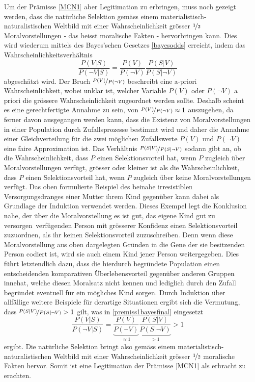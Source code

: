 \documentclass[a4paper,11pt]{article}
\numberwithin{equation}{section}
\begin{document}
Um der Prämisse \ref{MCN1} aber Legitimation zu erbringen, muss noch gezeigt werden, dass die natürliche Selektion gemäss einem materialistisch-naturalistischen Weltbild mit einer Wahrscheinlichkeit grösser $\nicefrac{1}{2}$ Moralvorstellungen -  das heisst moralische Fakten - hervorbringen kann. Dies wird wiederum mittels des Bayes'schen Gesetzes \eqref{bayesodds} erreicht, indem das Wahrscheinlichkeitsverhältnis \begin{equation}\label{premiss1bayesfinal}
\frac{P(V|S)}{P(\neg V|S)}
= \frac{P(V)}{P(\neg V)}\frac{P(S|V)}{P(S|\neg V)}
\end{equation} abgeschätzt wird. Der Bruch $\nicefrac{P(V)}{P(\neg V)}$ beschreibt eine a-priori Wahrscheinlichkeit, wobei unklar ist, welcher Variable $P(V)$ oder $P(\neg V)$ a priori die grössere Wahrscheinlichkeit zugeordnet werden sollte. Deshalb scheint es eine gerechtfertigte Annahme zu sein, von $\nicefrac{P(V)}{P(\neg V)} \approx 1$ auszugehen, da ferner davon ausgegangen werden kann, dass die Existenz von Moralvorstellungen in einer Population durch Zufallsprozesse bestimmt wird und daher die Annahme einer Gleichverteilung für die zwei möglichen Zufallswerte $P(V)$ und $P(\neg V)$ eine faire Approximation ist. Das Verhältnis $\nicefrac{P(S|V)}{P(S|\neg V)}$ sodann gibt an, ob die Wahrscheinlichkeit, dass $P$ einen Selektionsvorteil hat, wenn $P$ zugleich über Moralvorstellungen verfügt, grösser oder kleiner ist als die Wahrscheinlichkeit, dass $P$ einen Selektionsvorteil hat, wenn $P$ zugleich über keine Moralvorstellungen verfügt. Das oben formulierte Beispiel des beinahe irresistiblen Versorgungsdranges einer Mutter ihrem Kind gegenüber kann dabei als Grundlage der Induktion verwendet werden. Dieses Exempel legt die Konklusion nahe, der über die Moralvorstellung \flqq es ist gut, das eigene Kind gut zu versorgen\frqq\ verfügenden Person mit grösserer Konfidenz einen Selektionsvorteil zuzuordnen, als ihr keinen Selektionsvorteil zuzuschreiben. Denn wenn diese Moralvorstellung aus oben dargelegten Gründen in die Gene der sie besitzenden Person codiert ist, wird sie auch einem Kind jener Person weitergegeben. Dies führt letztendlich dazu, dass die hierdurch begründete Population einen entscheidenden komparativen Überlebensvorteil gegenüber anderen Gruppen innehat, welche diesen Moralsatz nicht kennen und lediglich durch den Zufall begründet eventuell für ein mögliches Kind sorgen. Durch Induktion über allfällige weitere Beispiele für derartige Situationen ergibt sich die Vermutung, dass $\nicefrac{P(S|V)}{P(S|\neg V)} > 1$ gilt, was in \eqref{premiss1bayesfinal} eingesetzt \begin{equation}
\frac{P(V|S)}{P(\neg V|S)}
= \underbrace{\frac{P(V)}{P(\neg V)}}_{\approx 1}\underbrace{\frac{P(S|V)}{P(S|\neg V)}}_{> 1} > 1
\end{equation} ergibt. Die natürliche Selektion bringt also gemäss einem materialistisch-naturalistischen Weltbild mit einer Wahrscheinlichkeit grösser $\nicefrac{1}{2}$ moralische Fakten hervor. Somit ist eine Legitimation der Prämisse \ref{MCN1} als erbracht zu erachten.
\end{document}
